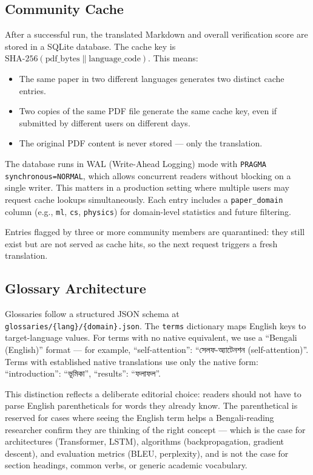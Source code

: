 \documentclass{article}
\begin{document}
\subsection{Community Cache}

After a successful run, the translated Markdown and overall verification score are stored in a SQLite database. The cache key is $\text{SHA-256}(\text{pdf\_bytes} \parallel \text{language\_code})$. This means:
\begin{itemize}
    \item The same paper in two different languages generates two distinct cache entries.
    \item Two copies of the same PDF file generate the same cache key, even if submitted by different users on different days.
    \item The original PDF content is never stored --- only the translation.
\end{itemize}

The database runs in WAL (Write-Ahead Logging) mode with \texttt{PRAGMA synchronous=NORMAL}, which allows concurrent readers without blocking on a single writer. This matters in a production setting where multiple users may request cache lookups simultaneously. Each entry includes a \texttt{paper\_domain} column (e.g., \texttt{ml}, \texttt{cs}, \texttt{physics}) for domain-level statistics and future filtering.

Entries flagged by three or more community members are quarantined: they still exist but are not served as cache hits, so the next request triggers a fresh translation.

\subsection{Glossary Architecture}

Glossaries follow a structured JSON schema at \texttt{glossaries/\{lang\}/\{domain\}.json}. The \texttt{terms} dictionary maps English keys to target-language values. For terms with no native equivalent, we use a ``Bengali (English)'' format --- for example, ``self-attention'': ``সেলফ-অ্যাটেনশন (self-attention)''. Terms with established native translations use only the native form: ``introduction'': ``ভূমিকা'', ``results'': ``ফলাফল''.

This distinction reflects a deliberate editorial choice: readers should not have to parse English parentheticals for words they already know. The parenthetical is reserved for cases where seeing the English term helps a Bengali-reading researcher confirm they are thinking of the right concept --- which is the case for architectures (Transformer, LSTM), algorithms (backpropagation, gradient descent), and evaluation metrics (BLEU, perplexity), and is not the case for section headings, common verbs, or generic academic vocabulary.
\end{document}

